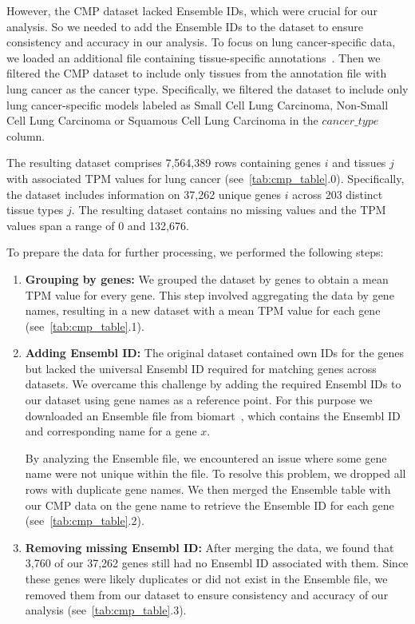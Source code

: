 However, the CMP dataset lacked Ensemble IDs, which were crucial for our analysis.
So we needed to add the Ensemble IDs to the dataset to ensure consistency and accuracy in our analysis.
To focus on lung cancer-specific data, we loaded an additional file containing tissue-specific annotations~\cite{cmp_tissue_models}.
Then we filtered the CMP dataset to include only tissues from the annotation file with lung cancer as the cancer type.
Specifically, we filtered the dataset to include only lung cancer-specific models labeled as
Small Cell Lung Carcinoma, Non-Small Cell Lung Carcinoma or Squamous Cell Lung Carcinoma in the $cancer\_type$ column.

The resulting dataset comprises 7,564,389 rows containing genes $i$ and tissues $j$
with associated TPM values for lung cancer (see~\cref{tab:cmp_table}.0).
Specifically, the dataset includes information on 37,262 unique genes $i$ across 203 distinct tissue types $j$.
The resulting dataset contains no missing values and the TPM values span a range of 0 and 132,676.

To prepare the data for further processing, we performed the following steps:
\begin{enumerate}
    \item \textbf{Grouping by genes:}
    We grouped the dataset by genes to obtain a mean TPM value for every gene.
    This step involved aggregating the data by gene names, resulting in a new dataset
    with a mean TPM value for each gene (see~\cref{tab:cmp_table}.1).

    \item \textbf{Adding Ensembl ID:}
    The original dataset contained own IDs for the genes but lacked the universal Ensembl ID required for matching genes across datasets.
    We overcame this challenge by adding the required Ensembl IDs to our dataset using gene names as a reference point.
    For this purpose we downloaded an Ensemble file from biomart~\cite{bio_marts},
    which contains the Ensembl ID and corresponding name for a gene $x$.

    By analyzing the Ensemble file, we encountered an issue where some gene name were not unique within the file.
    To resolve this problem, we dropped all rows with duplicate gene names.
    We then merged the Ensemble table with our CMP data on the gene name to retrieve the Ensemble ID for each gene (see~\cref{tab:cmp_table}.2).

    \item \textbf{Removing missing Ensembl ID:}
    After merging the data, we found that 3,760 of our 37,262 genes still had no Ensembl ID associated with them.
    Since these genes were likely duplicates or did not exist in the Ensemble file,
    we removed them from our dataset to ensure consistency and accuracy of our analysis (see~\cref{tab:cmp_table}.3).
\end{enumerate}

